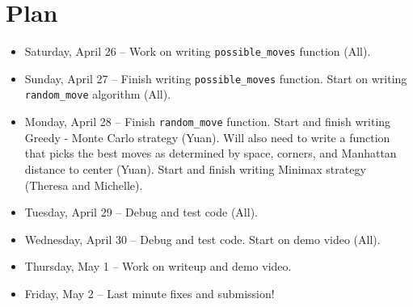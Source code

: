 \documentclass[11pt]{article}
\begin{document}
\section{Plan}
\begin{itemize}
\item Saturday, April 26 -- Work on writing \texttt{possible\_moves} function (All). 
\item Sunday, April 27 -- Finish writing \texttt{possible\_moves} function. Start on writing \texttt{random\_move} algorithm (All). 
\item Monday, April 28 -- Finish \texttt{random\_move} function. Start and finish writing Greedy - Monte Carlo strategy (Yuan). Will also need to write a function that picks the best moves as determined by space, corners, and Manhattan distance to center (Yuan). Start and finish writing Minimax strategy (Theresa and Michelle). 
\item Tuesday, April 29 -- Debug and test code (All).
\item Wednesday, April 30 -- Debug and test code. Start on demo video (All).
\item Thursday, May 1 -- Work on writeup and demo video. 
\item Friday, May 2 -- Last minute fixes and submission!
\end{itemize}
\end{document}
